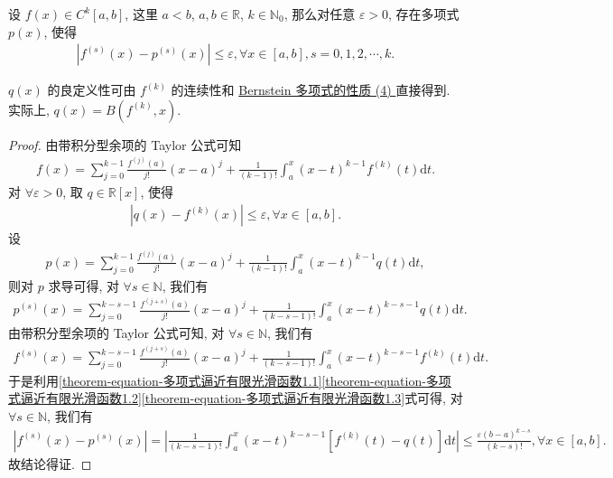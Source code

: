 \documentclass[../../main.tex]{subfiles}%
\begin{document}
\begin{theorem}[Weierstrass逼近定理]\label{theorem:多项式逼近有限阶光滑函数}
设 $f(x) \in C^{k}[a,b]$, 这里 $a < b$, $a,b \in \mathbb{R}$, $k \in \mathbb{N}_0$, 那么对任意 $\varepsilon > 0$, 存在多项式 $p(x)$, 使得
\begin{align*}
\left| f^{(s)}(x) - p^{(s)}(x) \right| \leqslant \varepsilon, \forall x \in [a,b], s = 0,1,2,\cdots,k.
\end{align*}
\end{theorem}
\begin{remark}
$q(x)$ 的良定义性可由 $f^{(k)}$ 的连续性和 \hyperref[theorem:Bernstein多项式的性质]{Bernstein 多项式的性质 (4) }直接得到. 实际上, $q(x) = B(f^{(k)},x)$.
\end{remark}
\begin{proof}

由带积分型余项的 Taylor 公式可知
\begin{align*}
f(x) = \sum_{j = 0}^{k - 1} \frac{f^{(j)}(a)}{j!}(x - a)^j + \frac{1}{(k - 1)!} \int_a^x (x - t)^{k - 1} f^{(k)}(t) \mathrm{d}t.
\end{align*}
对 $\forall \varepsilon > 0$, 取 $q \in \mathbb{R}[x]$, 使得
\begin{align}
|q(x) - f^{(k)}(x)| \leqslant \varepsilon, \forall x \in [a,b]. \label{theorem-equation-多项式逼近有限光滑函数1.1}
\end{align}
设
\begin{align*}
p(x) = \sum_{j = 0}^{k - 1} \frac{f^{(j)}(a)}{j!}(x - a)^j + \frac{1}{(k - 1)!} \int_a^x (x - t)^{k - 1} q(t) \mathrm{d}t,
\end{align*}
则对 $p$ 求导可得, 对 $\forall s \in \mathbb{N}$, 我们有
\begin{align}
p^{(s)}(x) = \sum_{j = 0}^{k - s - 1} \frac{f^{(j + s)}(a)}{j!}(x - a)^j + \frac{1}{(k - s - 1)!} \int_a^x (x - t)^{k - s - 1} q(t) \mathrm{d}t. \label{theorem-equation-多项式逼近有限光滑函数1.2}
\end{align}
由带积分型余项的 Taylor 公式可知, 对 $\forall s \in \mathbb{N}$, 我们有
\begin{align}
f^{(s)}(x) = \sum_{j = 0}^{k - s - 1} \frac{f^{(j + s)}(a)}{j!}(x - a)^j + \frac{1}{(k - s - 1)!} \int_a^x (x - t)^{k - s - 1} f^{(k)}(t) \mathrm{d}t.\label{theorem-equation-多项式逼近有限光滑函数1.3}
\end{align}
于是利用\eqref{theorem-equation-多项式逼近有限光滑函数1.1}\eqref{theorem-equation-多项式逼近有限光滑函数1.2}\eqref{theorem-equation-多项式逼近有限光滑函数1.3}式可得, 对 $\forall s \in \mathbb{N}$, 我们有
\begin{align*}
|f^{(s)}(x) - p^{(s)}(x)| = \left| \frac{1}{(k - s - 1)!} \int_a^x (x - t)^{k - s - 1} [f^{(k)}(t) - q(t)] \mathrm{d}t \right| \leqslant \frac{\varepsilon (b - a)^{k - s}}{(k - s)!}, \forall x \in [a,b].
\end{align*}
故结论得证.

\end{proof}
\end{document}
